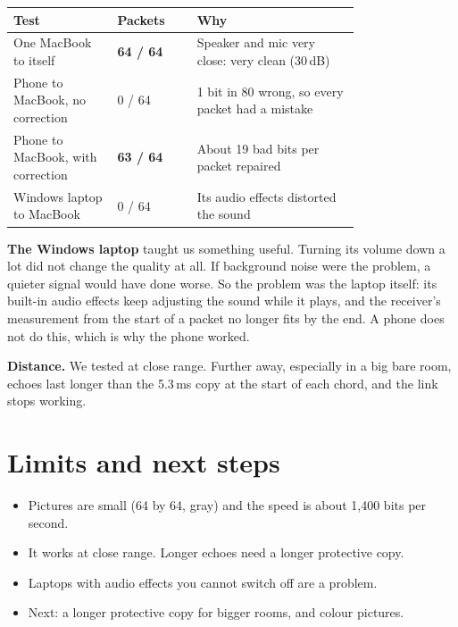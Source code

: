 \documentclass[12pt,a4paper]{article}
\begin{document}
\begin{center}
\begin{tabular}{@{}p{0.3\linewidth}lp{0.47\linewidth}@{}}
\toprule
Test & Packets & Why \\
\midrule
One MacBook to itself & \textbf{64 / 64} & Speaker and mic very close: very clean (30\,dB) \\
Phone to MacBook, no correction & 0 / 64 & 1 bit in 80 wrong, so every packet had a mistake \\
Phone to MacBook, with correction & \textbf{63 / 64} & About 19 bad bits per packet repaired \\
Windows laptop to MacBook & 0 / 64 & Its audio effects distorted the sound \\
\bottomrule
\end{tabular}
\end{center}

\textbf{The Windows laptop} taught us something useful. Turning its volume down a
lot did not change the quality at all. If background noise were the problem,
a quieter signal would have done worse. So the problem was the laptop itself:
its built-in audio effects keep adjusting the sound while it plays, and the
receiver's measurement from the start of a packet no longer fits by the end. A
phone does not do this, which is why the phone worked.

\textbf{Distance.} We tested at close range. Further away, especially in a
big bare room, echoes last longer than the 5.3\,ms copy at the start of each
chord, and the link stops working.

\section{Limits and next steps}

\begin{itemize}
\item Pictures are small (64 by 64, gray) and the speed is about 1,400 bits per second.
\item It works at close range. Longer echoes need a longer protective copy.
\item Laptops with audio effects you cannot switch off are a problem.
\item Next: a longer protective copy for bigger rooms, and colour pictures.
\end{itemize}

\end{document}
